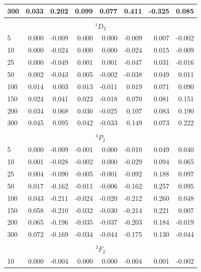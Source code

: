 \begin{table}
\begin{tabular}{lrrrrrrr}
  300 & 0.033 & 0.202 & 0.099 & 0.077 & 0.411 &-0.325 & 0.085 \\
\hline                                                                          
\\ \multicolumn{8}{c}{$^1D_2$} \\                                               
    5 & 0.000 &-0.009 & 0.000 & 0.000 &-0.009 & 0.007 &-0.002 \\
   10 & 0.000 &-0.024 & 0.000 & 0.000 &-0.024 & 0.015 &-0.009 \\
   25 & 0.000 &-0.049 & 0.001 & 0.001 &-0.047 & 0.031 &-0.016 \\
   50 & 0.002 &-0.043 & 0.005 &-0.002 &-0.038 & 0.049 & 0.011 \\
  100 & 0.014 & 0.003 & 0.013 &-0.011 & 0.019 & 0.071 & 0.090 \\
  150 & 0.024 & 0.041 & 0.023 &-0.018 & 0.070 & 0.081 & 0.151 \\
  200 & 0.034 & 0.068 & 0.030 &-0.025 & 0.107 & 0.083 & 0.190 \\
  300 & 0.045 & 0.095 & 0.042 &-0.033 & 0.149 & 0.073 & 0.222 \\
\hline                                                                          
\\ \multicolumn{8}{c}{$^3P_2$} \\                                               
    5 & 0.000 &-0.009 &-0.001 & 0.000 &-0.010 & 0.049 & 0.040 \\
   10 & 0.001 &-0.028 &-0.002 & 0.000 &-0.029 & 0.094 & 0.065 \\
   25 & 0.004 &-0.090 &-0.005 &-0.001 &-0.092 & 0.188 & 0.097 \\
   50 & 0.017 &-0.162 &-0.011 &-0.006 &-0.162 & 0.257 & 0.095 \\
  100 & 0.043 &-0.211 &-0.024 &-0.020 &-0.212 & 0.260 & 0.048 \\
  150 & 0.058 &-0.210 &-0.032 &-0.030 &-0.214 & 0.221 & 0.007 \\
  200 & 0.065 &-0.196 &-0.035 &-0.037 &-0.203 & 0.184 &-0.019 \\
  300 & 0.072 &-0.169 &-0.034 &-0.044 &-0.175 & 0.130 &-0.044 \\
\hline                                                                          
\\ \multicolumn{8}{c}{$^3F_2$} \\                                               
   10 & 0.000 &-0.004 & 0.000 & 0.000 &-0.004 & 0.001 &-0.002 \\

\end{tabular}
\end{table}
